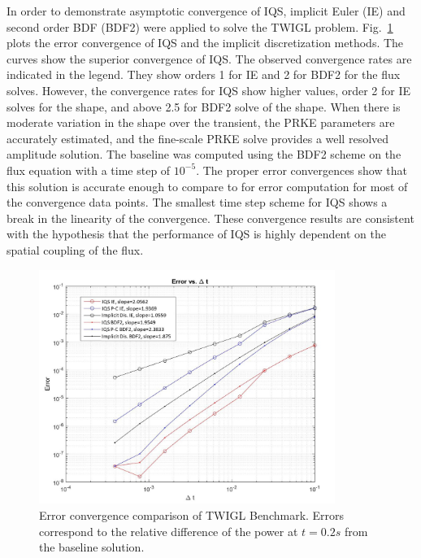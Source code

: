 \documentclass{elsarticle}
\newcommand{\fig}[1]{Fig.~\ref{#1}}                      %
\begin{document}

In order to demonstrate asymptotic convergence of IQS, implicit Euler (IE) and second order BDF (BDF2) were applied to solve the TWIGL problem. \fig{fig:TWIGL_conv} plots the error convergence of IQS and the implicit discretization methods.  The curves show the superior convergence of IQS. The observed convergence rates are indicated in the legend. They show orders 1 for IE and 2 for BDF2 for the flux solves. However, the convergence rates for IQS show higher values, order 2 for IE solves for the shape, and above 2.5 for BDF2 solve of the shape. When there is moderate variation in the shape over the transient, the PRKE parameters are accurately estimated, and the fine-scale PRKE solve provides a well resolved amplitude solution.
The baseline was computed using the BDF2 scheme on the flux equation with a time step of $10^{-5}$. The proper error convergences show that this solution is accurate enough to compare to for error computation for most of the convergence data points. The smallest time step scheme for IQS shows a break in the linearity of the convergence.
These convergence results are consistent with the hypothesis that the performance of IQS is highly dependent on the spatial coupling of the flux.

\begin{figure}[!htbp]
\centering
\includegraphics[height=3in]{figures/TWIGL_convergence.jpg}
\caption{Error convergence comparison of TWIGL Benchmark. Errors correspond to the relative difference of the power at $t=0.2 s$ from the baseline solution.}
\label{fig:TWIGL_conv}
\end{figure}
\end{document}
